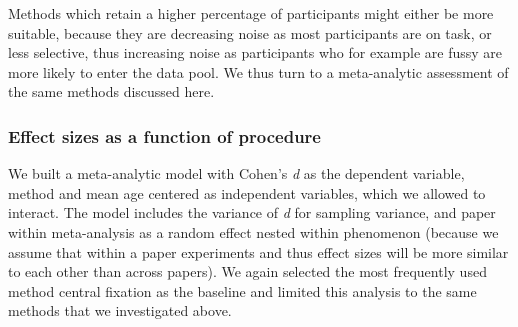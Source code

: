 \documentclass[english,floatsintext,man]{apa6}
\begin{document}
Methods which retain a higher percentage of participants might either be
more suitable, because they are decreasing noise as most participants
are on task, or less selective, thus increasing noise as participants
who for example are fussy are more likely to enter the data pool. We
thus turn to a meta-analytic assessment of the same methods discussed
here.

\subsubsection{Effect sizes as a function of
procedure}\label{effect-sizes-as-a-function-of-procedure}

We built a meta-analytic model with Cohen's \emph{d} as the dependent
variable, method and mean age centered as independent variables, which
we allowed to interact. The model includes the variance of \emph{d} for
sampling variance, and paper within meta-analysis as a random effect
nested within phenomenon (because we assume that within a paper
experiments and thus effect sizes will be more similar to each other
than across papers). We again selected the most frequently used method
central fixation as the baseline and limited this analysis to the same
methods that we investigated above.
\end{document}
